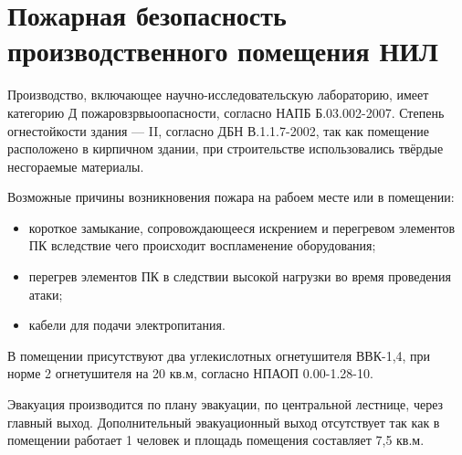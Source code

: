 \section{Пожарная безопасность производственного помещения НИЛ}

Производство, включающее научно-исследовательскую лабораторию, имеет категорию Д
пожаровзрвыоопасности, согласно НАПБ Б.03.002-2007. Степень огнестойкости здания
--- II, согласно ДБН В.1.1.7-2002, так как помещение расположено в кирпичном
здании, при строительстве использовались твёрдые несгораемые материалы.

Возможные причины возникновения пожара на рабоем месте или в помещении:

\begin{itemize}

    \item короткое замыкание, сопровождающееся искрением и перегревом элементов
    ПК вследствие чего происходит воспламенение оборудования;

    \item перегрев элементов ПК в следствии высокой нагрузки во время проведения
    атаки;

    \item кабели для подачи электропитания.

\end{itemize}

В помещении присутствуют два углекислотных огнетушителя ВВК-1,4, при норме 2
огнетушителя на 20 кв.м, согласно НПАОП 0.00-1.28-10.

Эвакуация производится по плану эвакуации, по центральной лестнице, через
главный выход. Дополнительный эвакуационный выход отсутствует так как в
помещении работает 1 человек и площадь помещения составляет 7,5 кв.м.

